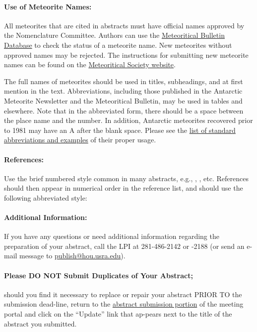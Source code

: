 \documentclass{lpsc_abstract}
\begin{document}
\paragraph{Use of Meteorite Names:}
All meteorites that are cited in abstracts must have official names approved by the Nomenclature Committee. Authors can use the \href{http://www.lpi.usra.edu/meteor/}{Meteoritical Bulletin Database} to check the status of a meteorite name. New meteorites without approved names may be rejected. The instructions for submitting new meteorite names can be found on the \href{http://meteoriticalsociety.org/?page_id=63}{Meteoritical Society website}.

The full names of meteorites should be used in titles, subheadings, and at first mention in the text. Abbreviations, including those published in the Antarctic Meteorite Newsletter and the Meteoritical Bulletin, may be used in tables and elsewhere. Note that in the abbreviated form, there should be a space between the place name and the number.
In addition, Antarctic meteorites recovered prior to 1981 may have an A after the blank space. Please see the \href{http://meteoriticalsociety.org/?page_id=61}{list of standard abbreviations and examples} of their proper usage.

\paragraph{References:}
Use the brief numbered style common in many abstracts, e.g., \cite{article1}, \cite{article2}, etc. References should then appear in numerical order in the reference list, and should use the following abbreviated style:
\nocite{article3,article4}



\paragraph{Additional Information:}
If you have any questions or need additional information
regarding the preparation of your abstract, call the LPI at 281-486-2142
or -2188 (or send an e-mail message to \href{mailto:publish@hou.usra.edu}{publish@hou.usra.edu}).

\paragraph{Please DO NOT Submit Duplicates of Your Abstract;} should you find it necessary to replace or repair your abstract PRIOR TO the submission dead-line, return to the \href{https://www.hou.usra.edu/meeting_portal/abstract_submission/}{abstract submission portion} of the meeting portal and click on the “Update” link that ap-pears next to the title of the abstract you submitted.
 

\end{document}
